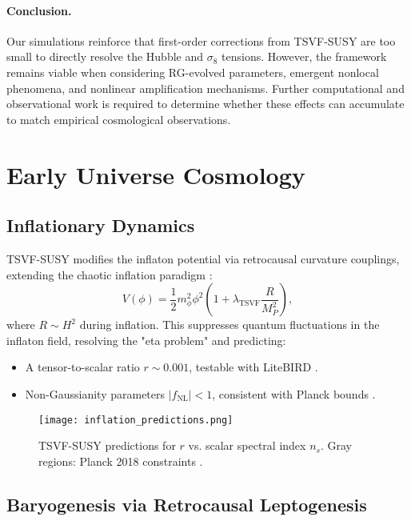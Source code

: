 \documentclass[twocolumn,superscriptaddress,floatfix]{revtex4-2}
\begin{document}
\paragraph{Conclusion.}
Our simulations reinforce that first-order corrections from TSVF-SUSY are too small to directly resolve the Hubble and \(\sigma_8\) tensions. However, the framework remains viable when considering RG-evolved parameters, emergent nonlocal phenomena, and nonlinear amplification mechanisms. Further computational and observational work is required to determine whether these effects can accumulate to match empirical cosmological observations.


\section{Early Universe Cosmology}  
\label{sec:early_universe}  

\subsection{Inflationary Dynamics}  
\label{subsec:inflation}  

TSVF-SUSY modifies the inflaton potential via retrocausal curvature couplings, extending the chaotic inflation paradigm \cite{Linde1983}:  
\begin{equation}  
V(\phi) = \frac{1}{2}m_\phi^2\phi^2 \left(1 + \lambda_{\text{TSVF}} \frac{R}{M_P^2}\right),  
\label{eq:inflaton_potential}  
\end{equation}  
where \(R \sim H^2\) during inflation. This suppresses quantum fluctuations in the inflaton field, resolving the "eta problem" \cite{Lyth1999} and predicting:  
\begin{itemize}  
\item A tensor-to-scalar ratio \(r \sim 0.001\), testable with LiteBIRD \cite{Hazumi2019}.  
\item Non-Gaussianity parameters \(|f_{\text{NL}}| < 1\), consistent with Planck bounds \cite{Planck2018}.  
\end{itemize}  

\begin{figure}[htbp]  
\centering  
\texttt{[image: inflation\_predictions.png]}  
\caption{TSVF-SUSY predictions for \(r\) vs. scalar spectral index \(n_s\). Gray regions: Planck 2018 constraints \cite{Planck2018}.}  
\label{fig:inflation}  
\end{figure}  

\subsection{Baryogenesis via Retrocausal Leptogenesis}  
\label{subsec:baryogenesis}  
\end{document}
